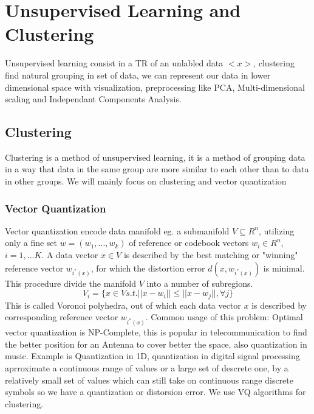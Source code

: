 \documentclass[12pt]{book}
\begin{document}
\section{Unsupervised Learning and Clustering}
Unsupervised learning consist in a TR of an unlabled data $<x>$, clustering find natural grouping in set of data, we can represent our data in lower dimensional space with visualization, preprocessing like PCA, Multi-dimensional scaling and Independant Components Analysis.


\subsection{Clustering}
Clustering is a method of unsupervised learning, it is a method of grouping data in a way that data in the same group are more similar to each other than to data in other groups. We will mainly focus on clustering and vector quantization


\subsubsection{Vector Quantization}
Vector quantization encode data manifold eg. a submanifold $V \subseteq R^n$, utilizing only a fine set $w= (w_1,...,w_k)$ of reference or codebook vectors $w_i \in R^n$, $i = 1,...K$. A data vector $x \in V$ is described by the best matching or "winning" reference vector $w_{i^*(x)}$, for which the distortion error $d(x, w_{i^*(x)})$ is minimal.\newline\newline
This procedure divide the manifold $V$ into a number of subregions.
\begin{equation}
	V_i = \{x \in V s.t. ||x - w_i|| \leq ||x - w_j||, \forall j\}
\end{equation}
This is called Voronoi polyhedra, out of which each data vector $x$ is described by corresponding reference vector $w_{i^*(x)}$. 
Common usage of this problem: Optimal vector quantization is NP-Complete, this is popular in telecommunication to find the better position for an Antenna to cover better the space, also quantization in music. Example is Quantization in 1D, quantization in digital signal processing aprroximate a continuous range of values or a large set of descrete one, by a relatively small set of values which can still take on continuous range discrete symbols so we have a quantization or distorsion error.
We use VQ algorithms for clustering.
\end{document}
